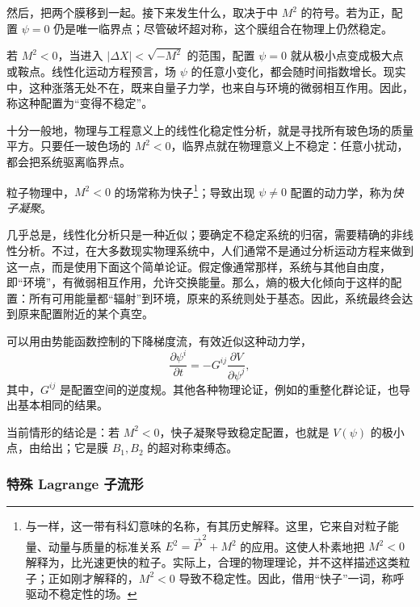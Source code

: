 然后，把两个膜移到一起。接下来发生什么，取决于中 $M^2$ 的符号。若为正，配置 $\psi=0$ 仍是唯一临界点；尽管破坏超对称，这个膜组合在物理上仍然稳定。

若 $M^2<0$，当进入 $|\Delta X|<\sqrt{-M^2}$ 的范围，配置 $\psi=0$ 就从极小点变成极大点或鞍点。线性化运动方程预言，场 $\psi$ 的任意小变化，都会随时间指数增长。现实中，这种涨落无处不在，既来自量子力学，也来自与环境的微弱相互作用。因此，称这种配置为“变得不稳定”。

十分一般地，物理与工程意义上的线性化稳定性分析，就是寻找所有玻色场的质量平方。只要任一玻色场的 $M^2<0$，临界点就在物理意义上不稳定：任意小扰动，都会把系统驱离临界点。

粒子物理中，$M^2<0$ 的场常称为快子\footnote{与一样，这一带有科幻意味的名称，有其历史解释。这里，它来自对粒子能量、动量与质量的标准关系 $E^2=\vec P^{\,2}+M^2$ 的应用。这使人朴素地把 $M^2<0$ 解释为，比光速更快的粒子。实际上，合理的物理理论，并不这样描述这类粒子；正如刚才解释的，$M^2<0$ 导致不稳定性。因此，借用“快子”一词，称呼驱动不稳定性的场。}；导致出现 $\psi\ne0$ 配置的动力学，称为\emph{快子凝聚}。

几乎总是，线性化分析只是一种近似；要确定不稳定系统的归宿，需要精确的非线性分析。不过，在大多数现实物理系统中，人们通常不是通过分析运动方程来做到这一点，而是使用下面这个简单论证。假定像通常那样，系统与其他自由度，即“环境”，有微弱相互作用，允许交换能量。那么，熵的极大化倾向于这样的配置：所有可用能量都“辐射”到环境，原来的系统则处于基态。因此，系统最终会达到原来配置附近的某个真空。

可以用由势能函数控制的下降梯度流，有效近似这种动力学，
\[
\frac{\partial\psi^i}{\partial t}
=-G^{ij}\frac{\partial V}{\partial\psi^j},
\]
其中，$G^{ij}$ 是配置空间的逆度规。其他各种物理论证，例如的重整化群论证，也导出基本相同的结果。

当前情形的结论是：若 $M^2<0$，快子凝聚导致稳定配置，也就是 $V(\psi)$ 的极小点，由给出；它是膜 $B_1,B_2$ 的超对称束缚态。

\subsubsection{特殊 Lagrange 子流形}\label{sec:5.4.4.3}

